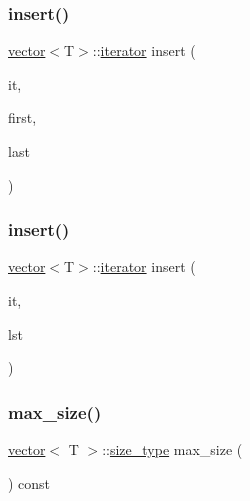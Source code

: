 \subsubsection{\texorpdfstring{insert()}{insert()}\hspace{0.1cm}{\footnotesize\ttfamily [9/10]}}
{\footnotesize\ttfamily \mbox{\hyperlink{classvector}{vector}}$<$T$>$\+::\mbox{\hyperlink{classvector_a35c955cacac6aacaa1e82874b1628865}{iterator}} insert (\begin{DoxyParamCaption}\item[{typename \mbox{\hyperlink{classvector}{vector}}$<$ T $>$\+::\mbox{\hyperlink{classvector_a2fc97dce62b7053449cc868607540dba}{const\+\_\+iterator}}}]{it,  }\item[{Input\+It}]{first,  }\item[{Input\+It}]{last }\end{DoxyParamCaption})}

\mbox{\label{classvector_a6941eb89e5693b388e49d5fdf96dc24e}} 
\subsubsection{\texorpdfstring{insert()}{insert()}\hspace{0.1cm}{\footnotesize\ttfamily [10/10]}}
{\footnotesize\ttfamily \mbox{\hyperlink{classvector}{vector}}$<$T$>$\+::\mbox{\hyperlink{classvector_a35c955cacac6aacaa1e82874b1628865}{iterator}} insert (\begin{DoxyParamCaption}\item[{typename \mbox{\hyperlink{classvector}{vector}}$<$ T $>$\+::\mbox{\hyperlink{classvector_a2fc97dce62b7053449cc868607540dba}{const\+\_\+iterator}}}]{it,  }\item[{std\+::initializer\+\_\+list$<$ T $>$}]{lst }\end{DoxyParamCaption})}

\mbox{\label{classvector_a972fbaa1a8a003f5a7eec364354982f9}} 
\subsubsection{\texorpdfstring{max\+\_\+size()}{max\_size()}}
{\footnotesize\ttfamily \mbox{\hyperlink{classvector}{vector}}$<$ T $>$\+::\mbox{\hyperlink{classvector_ada51e68d31936547d3729c82daf6b7c6}{size\+\_\+type}} max\+\_\+size (\begin{DoxyParamCaption}{ }\end{DoxyParamCaption}) const\hspace{0.3cm}{\ttfamily [noexcept]}}

